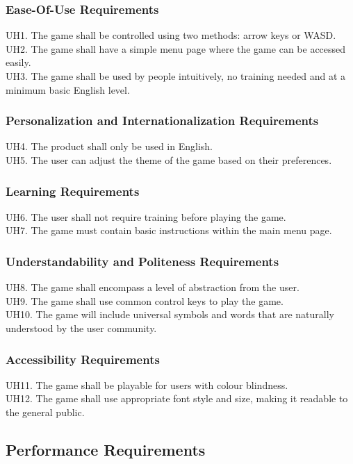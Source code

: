 \documentclass[12pt]{article}
\begin{document}
    \subsubsection{Ease-Of-Use Requirements}
    UH1. The game shall be controlled using two methods: arrow keys or WASD.\\
    UH2. The game shall have a simple menu page where the game can be accessed easily.\\
    UH3. The game shall be used by people intuitively, no training needed and at a minimum basic English level.
    
    \subsubsection{Personalization and Internationalization Requirements}
    UH4. The product shall only be used in English.\\
    UH5. The user can adjust the theme of the game based on their preferences.
    
    \subsubsection{Learning Requirements}
    UH6. The user shall not require training before playing the game.\\
    UH7. The game must contain basic instructions within the main menu page.

    \subsubsection{Understandability and Politeness Requirements}
    UH8. The game shall encompass a level of abstraction from the user.\\
    UH9. The game shall use common control keys to play the game.\\
    UH10. The game will include universal symbols and words that are naturally understood by the user community.
    
    \subsubsection{Accessibility Requirements}
    UH11. The game shall be playable for users with colour blindness.\\
    UH12. The game shall use appropriate font style and size, making it readable to the general public.
    
\subsection{Performance Requirements}
\end{document}
